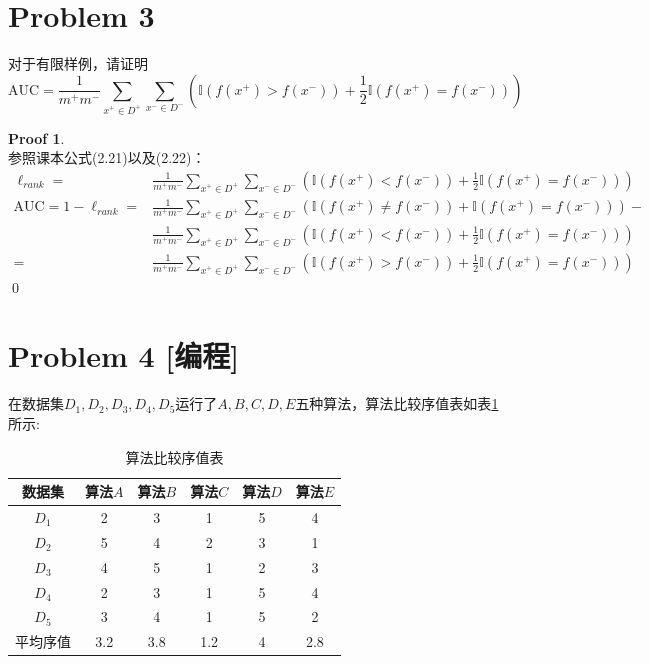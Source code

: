 \documentclass[a4paper,UTF8]{article}
\theoremstyle{definition}
\newtheorem*{prove}{Proof}
\begin{document}
\section*{Problem 3}
对于有限样例，请证明
\[
\text{AUC} = \frac{1}{m^+m^-}\sum_{x^+\in D^+}\sum_{x^-\in D^-}\left(\mathbb{I}(f(x^+)>f(x^-))+\frac{1}{2}\mathbb{I}(f(x^+)=f(x^-))\right)
\]

\begin{prove}
~\\参照课本公式(2.21)以及(2.22)：
\begin{equation}\nonumber
\begin{aligned}
\ell_{rank} = &\frac{1}{m^+m^-}\sum_{x^+\in D^+}\sum_{x^-\in D^-}\left(\mathbb{I}(f(x^+)<f(x^-))+\frac{1}{2}\mathbb{I}(f(x^+)=f(x^-))\right)\\
\text{AUC} = 1-\ell_{rank} = &\frac{1}{m^+m^-}\sum_{x^+\in D^+}\sum_{x^-\in D^-}\left(\mathbb{I}(f(x^+)\neq f(x^-))+\mathbb{I}(f(x^+)=f(x^-))\right) -\\ &\frac{1}{m^+m^-}\sum_{x^+\in D^+}\sum_{x^-\in D^-}\left(\mathbb{I}(f(x^+)<f(x^-))+\frac{1}{2}\mathbb{I}(f(x^+)=f(x^-))\right)\\=&\frac{1}{m^+m^-}\sum_{x^+\in D^+}\sum_{x^-\in D^-}\left(\mathbb{I}(f(x^+)>f(x^-))+\frac{1}{2}\mathbb{I}(f(x^+)=f(x^-))\right)
\end{aligned}
\end{equation}
\qed
\end{prove}

\section*{Problem 4 [编程]} 
在数据集$D_1,D_2,D_3,D_4,D_5$运行了$A,B,C,D,E$五种算法，算法比较序值表如表\ref{table:ranking}所示:
\begin{table}[h]
\centering
\caption{算法比较序值表} \vspace{2mm}\label{table:ranking}
\begin{tabular}{c|c c c c c}\hline
数据集 & 算法$A$ & 算法$B$  & 算法$C$  &算法$D$  &算法$E$ \\
\hline
$D_1$ & 2  & 3 &  1 &  5  & 4\\
$D_2$ & 5  & 4 &  2 &  3  & 1\\
$D_3$ & 4  & 5 &  1 &  2  & 3\\
$D_4$ & 2  & 3 &  1 &  5  & 4\\
$D_5$ & 3  & 4 &  1 &  5  & 2\\
\hline
平均序值 & 3.2 &  3.8 & 1.2 &  4 &  2.8 \\
\hline
\end{tabular}
\end{table}
\end{document}
